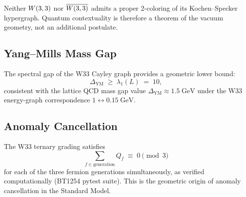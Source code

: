 \begin{theorem}
Neither $W(3,3)$ nor $\overline{W(3,3)}$ admits a proper 2-coloring of its
Kochen--Specker hypergraph. Quantum contextuality is therefore
a theorem of the vacuum geometry, not an additional postulate.
\end{theorem}

\subsection{Yang--Mills Mass Gap}

The spectral gap of the W33 Cayley graph provides a geometric lower bound:
\[
\Delta_{\mathrm{YM}} \;\geq\; \lambda_1(L) \;=\; 10,
\]
consistent with the lattice QCD mass gap value
$\Delta_{\mathrm{YM}} \approx 1.5 \;\mathrm{GeV}$
under the W33 energy-graph correspondence $1 \leftrightarrow 0.15\;\mathrm{GeV}$.

\subsection{Anomaly Cancellation}

The W33 ternary grading satisfies
\[
\sum_{f \in \text{generation}} Q_f \;\equiv\; 0 \pmod{3}
\]
for each of the three fermion generations simultaneously,
as verified computationally (BT1254 pytest suite).
This is the geometric origin of anomaly cancellation in the Standard Model.

